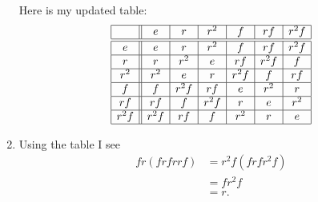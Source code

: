\documentclass[noauthor,nooutcomes,12pt,hints]{ximera}
\begin{document}
\begin{question}
\begin{freeResponse}
\begin{enumerate}
      Here is my updated table:
       \[
  \begin{array}{|c||c|c|c|c|c|c|}
    \hline
    & e & r & r^2 & f & rf & r^2f\\ \hline\hline
    e & e & r & r^2 & f & rf & r^2f\\ \hline
    r & r & r^2 & e & rf & r^2f & f\\ \hline
    r^2 & r^2 & e & r & r^2f & f &rf\\ \hline
    f  & f & r^2f & rf & e & r^2 & r\\ \hline
    rf & rf & f & r^2f & r & e & r^2\\ \hline
    r^2f & r^2f & rf & f & r^2 & r & e\\ \hline
  \end{array}
  \]
\item Using the table I see
  \begin{align*}
    fr(frfrrf) &= r^2f(frfr^2f)\\
    &= fr^2f\\
    &=r.
  \end{align*}
    \end{enumerate}
  \end{freeResponse}
\end{question}
\end{document}
